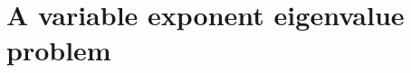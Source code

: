 \documentclass[12pt]{article}
\numberwithin{komcounter}{section}
\begin{document}
%
%
%

\section{A variable exponent eigenvalue problem}
\label{sec:variable-exp}


\setcounter{theorem}{0}
\setcounter{equation}{0}
\end{document}
